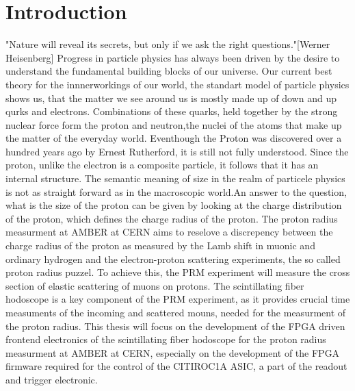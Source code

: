\chapter{Introduction}
\label{chap:introduction}
"Nature will reveal its secrets, but only if we ask the right questions."[Werner Heisenberg]
\newline
Progress in particle physics has always been driven by the desire to understand the fundamental building blocks of our universe.
\newline Our current best theory for the innnerworkings of our world,
the standart model of particle physics shows us, that the matter we see around us is mostly made up of down and up qurks and electrons.
Combinations of these quarks, held together by the strong nuclear force form the proton and neutron,the nuclei of the atoms that make up the matter of the everyday world.
Eventhough the Proton was discovered over a hundred years ago by Ernest Rutherford\autocite{discoveryProton}, it is still not fully understood.
\newline
Since the proton, unlike the electron is a composite particle, it follows that it has an internal structure.
The semantic meaning of size in the realm of particele physics is not as straight forward as in the macroscopic world.An answer to the question,
what is the size of the proton can be given 
by looking at the charge distribution of the proton, which defines the charge radius of the proton.
\newline
The proton radius measurment at AMBER at CERN aims to reselove a discrepency between the charge radius of the proton as measured by the Lamb shift in muonic and ordinary hydrogen and the electron-proton scattering experiments,
the so called proton radius puzzel.
\newline
To achieve this, the PRM experiment will measure the cross section of elastic scattering of muons on protons.
The scintillating fiber hodoscope is a key component of the PRM experiment, as it provides crucial time measuments of the incoming and scattered mouns, needed for the measurment of the proton radius\Autocite{ProposalAmber}.
\newline
This thesis will focus on the development of the FPGA driven frontend electronics of the scintillating fiber hodoscope 
for the proton radius measurment at AMBER at CERN,
especially on the development of the FPGA firmware required for the control of the CITIROC1A ASIC, a part of the readout and trigger electronic. 
\newline
 
